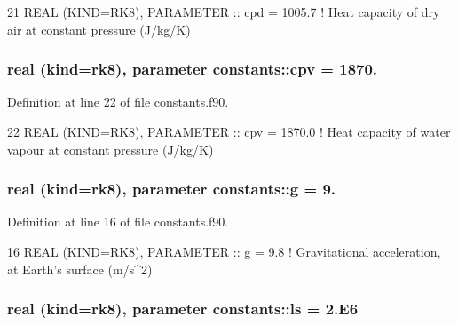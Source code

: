 \begin{DoxyCode}
21 \textcolor{keywordtype}{REAL (KIND=RK8)}, \textcolor{keywordtype}{PARAMETER}  :: cpd      = 1005.7            \textcolor{comment}{! Heat capacity of dry air at constant pressure
       (J/kg/K)}
\end{DoxyCode}
\subsubsection[{\texorpdfstring{cpv}{cpv}}]{\setlength{\rightskip}{0pt plus 5cm}real (kind=rk8), parameter constants\+::cpv = 1870.}\hypertarget{namespaceconstants_afc5ea9cd5f9cf3a42e750ba5ab73c967}{}\label{namespaceconstants_afc5ea9cd5f9cf3a42e750ba5ab73c967}


Definition at line 22 of file constants.\+f90.


\begin{DoxyCode}
22 \textcolor{keywordtype}{REAL (KIND=RK8)}, \textcolor{keywordtype}{PARAMETER}  :: cpv      = 1870.0            \textcolor{comment}{! Heat capacity of water vapour at constant
       pressure (J/kg/K)}
\end{DoxyCode}
\subsubsection[{\texorpdfstring{g}{g}}]{\setlength{\rightskip}{0pt plus 5cm}real (kind=rk8), parameter constants\+::g = 9.}\hypertarget{namespaceconstants_a046aef138fbc8d05251d4fdc6eb3ee89}{}\label{namespaceconstants_a046aef138fbc8d05251d4fdc6eb3ee89}


Definition at line 16 of file constants.\+f90.


\begin{DoxyCode}
16 \textcolor{keywordtype}{REAL (KIND=RK8)}, \textcolor{keywordtype}{PARAMETER}  :: g        = 9.8               \textcolor{comment}{! Gravitational acceleration, at Earth's
       surface (m/s^2)}
\end{DoxyCode}
\subsubsection[{\texorpdfstring{ls}{ls}}]{\setlength{\rightskip}{0pt plus 5cm}real (kind=rk8), parameter constants\+::ls = 2.\+E6}\hypertarget{namespaceconstants_a0fdb1c80757efccb4c694c79206a3d83}{}\label{namespaceconstants_a0fdb1c80757efccb4c694c79206a3d83}



